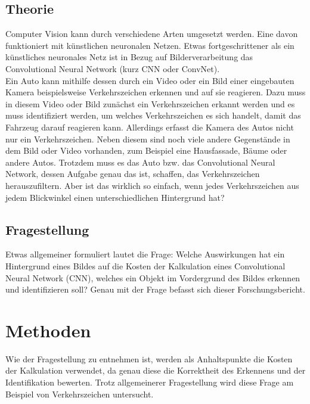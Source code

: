 \documentclass[paper=A4,pagesize=auto,12pt,headinclude=true,footinclude=true,BCOR=0mm,DIV=calc]{scrartcl}
\newcommand{\sectionspace}{
	\vspace{0.5cm}
}
\begin{document}
\subsection{Theorie}\label{sec:Theorie} %
Computer Vision kann durch verschiedene Arten umgesetzt werden. Eine davon funktioniert mit künstlichen neuronalen Netzen. Etwas fortgeschrittener als ein künstliches neuronales Netz ist in Bezug auf Bilderverarbeitung das Convolutional Neural Network (kurz CNN oder ConvNet). \cite{script}\\
Ein Auto kann mithilfe dessen durch ein Video oder ein Bild einer eingebauten Kamera beispielsweise Verkehrszeichen erkennen und auf sie reagieren. Dazu muss in diesem Video oder Bild zunächst ein Verkehrszeichen erkannt werden und es muss identifiziert werden, um welches Verkehrszeichen es sich handelt, damit das Fahrzeug darauf reagieren kann. Allerdings erfasst die Kamera des Autos nicht nur ein Verkehrszeichen. Neben diesem sind noch viele andere Gegenstände in dem Bild oder Video vorhanden, zum Beispiel eine Hausfassade, Bäume oder andere Autos. Trotzdem muss es das Auto bzw. das Convolutional Neural Network, dessen Aufgabe genau das ist, schaffen, das Verkehrszeichen herauszufiltern. Aber ist das wirklich so einfach, wenn jedes Verkehrszeichen aus jedem Blickwinkel einen unterschiedlichen Hintergrund hat?

\subsection{Fragestellung}
Etwas allgemeiner formuliert lautet die Frage: Welche Auswirkungen hat ein Hintergrund eines Bildes auf die Kosten der Kalkulation eines Convolutional Neural Network (CNN), welches ein Objekt im Vordergrund des Bildes erkennen und identifizieren soll? Genau mit der Frage befasst sich dieser Forschungsbericht.

\sectionspace
\section{Methoden}\label{sec:Methoden}
Wie der Fragestellung zu entnehmen ist, werden als Anhaltspunkte die Kosten der Kalkulation verwendet, da genau diese die Korrektheit des Erkennens und der Identifikation bewerten. Trotz allgemeinerer Fragestellung wird diese Frage am Beispiel von Verkehrszeichen untersucht.
\end{document}
